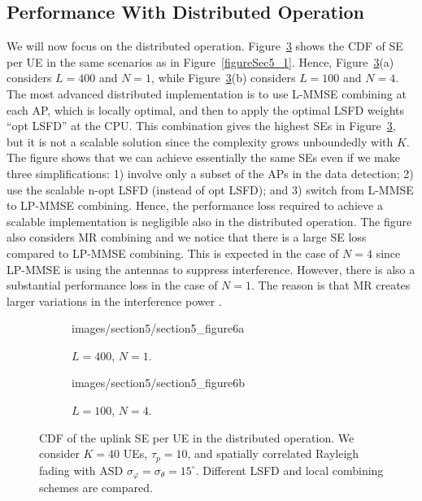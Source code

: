 \subsection{Performance With Distributed Operation}

We will now focus on the distributed operation. Figure~\ref{figureSec5_2} shows the \gls{CDF} of SE per UE in the same scenarios as in Figure~\ref{figureSec5_1}. Hence, 
Figure~\ref{figureSec5_2}(a) considers $L=400$ and $N=1$, while Figure~\ref{figureSec5_2}(b) considers $L=100$ and $N=4$.
The most advanced distributed implementation is to use L-MMSE combining at each AP, which is locally optimal, and then to apply the optimal LSFD weights ``opt LSFD'' at the CPU. This combination gives the highest SEs in Figure~\ref{figureSec5_2}, but it is not a scalable solution since the complexity grows unboundedly with $K$. The figure shows that we can achieve essentially the same SEs even if we make three simplifications: 1) involve only a subset of the APs in the data detection; 2) use the scalable n-opt LSFD (instead of opt LSFD); and 3) switch from L-MMSE to LP-MMSE combining.
Hence, the performance loss required to achieve a scalable implementation is negligible also in the distributed operation.
The figure also considers MR combining and we notice that there is a large SE loss compared to LP-MMSE combining. This is expected in the case of $N=4$ since LP-MMSE is using the antennas to suppress interference. However, there is also a substantial performance loss in the case of $N=1$. The reason is that MR creates larger variations in the interference power \cite{Bjornson2020a}.

\begin{figure}[p!]
        \begin{subfigure}[b]{\columnwidth} \centering 
	\begin{overpic}[width=0.88\columnwidth,tics=10]{images/section5/section5_figure6a}
\end{overpic} \label{figureSec5_2a}
                \caption{$L=400$, $N=1$.} 
                 \vspace{4mm}
        \end{subfigure} 
        \begin{subfigure}[b]{\columnwidth} \centering 
	\begin{overpic}[width=0.88\columnwidth,tics=10]{images/section5/section5_figure6b}
\end{overpic} \label{figureSec5_2b} 
                \caption{$L=100$, $N=4$.} 
        \end{subfigure} 
	\caption{CDF of the uplink SE per UE in the distributed operation. We consider $K=40$ UEs, $\tau_p=10$, and spatially correlated Rayleigh fading with ASD $\sigma_{\varphi}=\sigma_{\theta}=15^{\circ}$. Different LSFD and local combining schemes are compared.}\label{figureSec5_2}
\end{figure}

